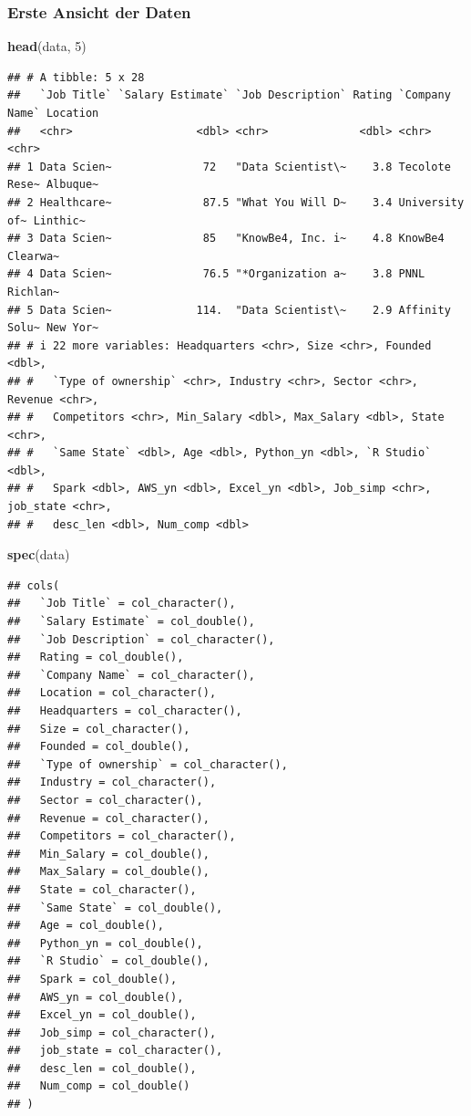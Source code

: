 \documentclass[
]{article}
\newenvironment{Shaded}{\begin{snugshade}}{\end{snugshade}}
\newcommand{\DecValTok}[1]{\textcolor[rgb]{0.00,0.00,0.81}{#1}}
\newcommand{\FunctionTok}[1]{\textcolor[rgb]{0.13,0.29,0.53}{\textbf{#1}}}
\newcommand{\NormalTok}[1]{#1}
\begin{document}
\subsubsection{Erste Ansicht der Daten}\label{erste-ansicht-der-daten}

\begin{Shaded}
\begin{Highlighting}[]
\FunctionTok{head}\NormalTok{(data, }\DecValTok{5}\NormalTok{)}
\end{Highlighting}
\end{Shaded}

\begin{verbatim}
## # A tibble: 5 x 28
##   `Job Title` `Salary Estimate` `Job Description` Rating `Company Name` Location
##   <chr>                   <dbl> <chr>              <dbl> <chr>          <chr>   
## 1 Data Scien~              72   "Data Scientist\~    3.8 Tecolote Rese~ Albuque~
## 2 Healthcare~              87.5 "What You Will D~    3.4 University of~ Linthic~
## 3 Data Scien~              85   "KnowBe4, Inc. i~    4.8 KnowBe4        Clearwa~
## 4 Data Scien~              76.5 "*Organization a~    3.8 PNNL           Richlan~
## 5 Data Scien~             114.  "Data Scientist\~    2.9 Affinity Solu~ New Yor~
## # i 22 more variables: Headquarters <chr>, Size <chr>, Founded <dbl>,
## #   `Type of ownership` <chr>, Industry <chr>, Sector <chr>, Revenue <chr>,
## #   Competitors <chr>, Min_Salary <dbl>, Max_Salary <dbl>, State <chr>,
## #   `Same State` <dbl>, Age <dbl>, Python_yn <dbl>, `R Studio` <dbl>,
## #   Spark <dbl>, AWS_yn <dbl>, Excel_yn <dbl>, Job_simp <chr>, job_state <chr>,
## #   desc_len <dbl>, Num_comp <dbl>
\end{verbatim}

\begin{Shaded}
\begin{Highlighting}[]
\FunctionTok{spec}\NormalTok{(data)}
\end{Highlighting}
\end{Shaded}

\begin{verbatim}
## cols(
##   `Job Title` = col_character(),
##   `Salary Estimate` = col_double(),
##   `Job Description` = col_character(),
##   Rating = col_double(),
##   `Company Name` = col_character(),
##   Location = col_character(),
##   Headquarters = col_character(),
##   Size = col_character(),
##   Founded = col_double(),
##   `Type of ownership` = col_character(),
##   Industry = col_character(),
##   Sector = col_character(),
##   Revenue = col_character(),
##   Competitors = col_character(),
##   Min_Salary = col_double(),
##   Max_Salary = col_double(),
##   State = col_character(),
##   `Same State` = col_double(),
##   Age = col_double(),
##   Python_yn = col_double(),
##   `R Studio` = col_double(),
##   Spark = col_double(),
##   AWS_yn = col_double(),
##   Excel_yn = col_double(),
##   Job_simp = col_character(),
##   job_state = col_character(),
##   desc_len = col_double(),
##   Num_comp = col_double()
## )
\end{verbatim}
\end{document}
